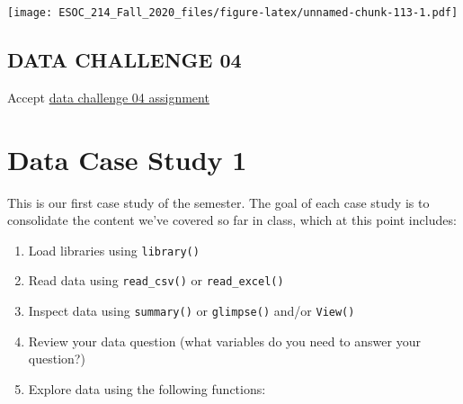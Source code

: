 \documentclass[
]{book}
\newenvironment{Shaded}{\begin{snugshade}}{\end{snugshade}}
\newcommand{\DataTypeTok}[1]{\textcolor[rgb]{0.13,0.29,0.53}{#1}}
\newcommand{\DecValTok}[1]{\textcolor[rgb]{0.00,0.00,0.81}{#1}}
\newcommand{\KeywordTok}[1]{\textcolor[rgb]{0.13,0.29,0.53}{\textbf{#1}}}
\newcommand{\NormalTok}[1]{#1}
\newcommand{\OperatorTok}[1]{\textcolor[rgb]{0.81,0.36,0.00}{\textbf{#1}}}
\newcommand{\StringTok}[1]{\textcolor[rgb]{0.31,0.60,0.02}{#1}}
\begin{document}
\begin{Shaded}
\end{Shaded}

\texttt{[image: ESOC\_214\_Fall\_2020\_files/figure-latex/unnamed-chunk-113-1.pdf]}

\hypertarget{data-challenge-04}{%
\section{DATA CHALLENGE 04}\label{data-challenge-04}}

Accept \href{https://classroom.github.com/a/7LkbbJyL}{data challenge 04 assignment}

\hypertarget{data-case-study-1}{%
\chapter{Data Case Study 1}\label{data-case-study-1}}

This is our first case study of the semester. The goal of each case study is to consolidate the content we've covered so far in class, which at this point includes:

\begin{enumerate}
\def\labelenumi{\arabic{enumi}.}
\item
  Load libraries using \texttt{library()}
\item
  Read data using \texttt{read\_csv()} or \texttt{read\_excel()}
\item
  Inspect data using \texttt{summary()} or \texttt{glimpse()} and/or \texttt{View()}
\item
  Review your data question (what variables do you need to answer your question?)
\item
  Explore data using the following functions:
\end{enumerate}
\end{document}
